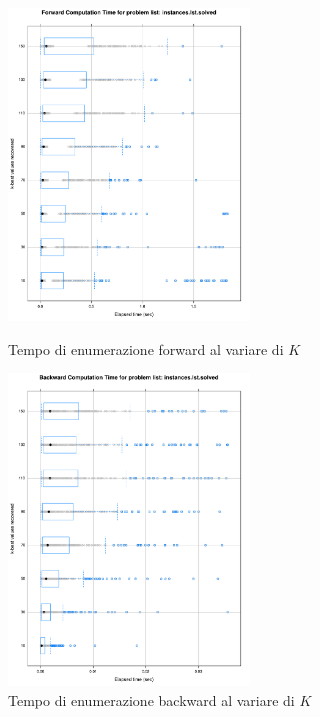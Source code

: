 \documentclass{llncs}
\begin{document}
\begin{figure}[!hb]
  \centering

  \begin{minipage}{0.35\linewidth} 
  \raggedleft
  \includegraphics[width=6.4cm]{img/graph_all-time_by_k_fw.pdf}
  \caption{Tempo di enumerazione forward al variare di $K$}
  \label{fig:time_by_k_fw}
 \end{minipage}
 \hspace{2.5cm}
 \begin{minipage}{0.35\linewidth}
  \raggedright  
  \includegraphics[width=6.4cm]{img/graph_all-time_by_k_bw.pdf}
  \caption{Tempo di enumerazione backward al variare di $K$}
  \label{fig:time_by_k_bw}
  \end{minipage}
  
\end{figure}

\newpage
\end{document}
